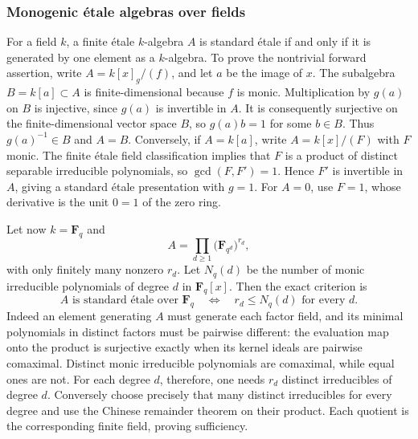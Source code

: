 \subsubsection{Monogenic étale algebras over fields}\label{monogenic-uxe9tale-algebras-over-fields}

For a field \(k\), a finite étale \(k\)-algebra \(A\) is standard étale if and only if it is generated by one element as a \(k\)-algebra. To prove the nontrivial forward assertion, write \(A=k[x]_g/(f)\), and let \(a\) be the image of \(x\). The subalgebra \(B=k[a]\subset A\) is finite-dimensional because \(f\) is monic. Multiplication by \(g(a)\) on \(B\) is injective, since \(g(a)\) is invertible in \(A\). It is consequently surjective on the finite-dimensional vector space \(B\), so \(g(a)b=1\) for some \(b\in B\). Thus \(g(a)^{-1}\in B\) and \(A=B\). Conversely, if \(A=k[a]\), write \(A=k[x]/(F)\) with \(F\) monic. The finite étale field classification implies that \(F\) is a product of distinct separable irreducible polynomials, so \(\gcd(F,F')=1\). Hence \(F'\) is invertible in \(A\), giving a standard étale presentation with \(g=1\). For \(A=0\), use \(F=1\), whose derivative is the unit \(0=1\) of the zero ring.

Let now \(k=\mathbf F_q\) and \[
A=\prod_{d\ge1}\bigl(\mathbf F_{q^d}\bigr)^{r_d},
\] with only finitely many nonzero \(r_d\). Let \(N_q(d)\) be the number of monic irreducible polynomials of degree \(d\) in \(\mathbf F_q[x]\). Then the exact criterion is \[
A\text{ is standard étale over }\mathbf F_q
\quad\Longleftrightarrow\quad
r_d\le N_q(d)\text{ for every }d.
\] Indeed an element generating \(A\) must generate each factor field, and its minimal polynomials in distinct factors must be pairwise different: the evaluation map onto the product is surjective exactly when its kernel ideals are pairwise comaximal. Distinct monic irreducible polynomials are comaximal, while equal ones are not. For each degree \(d\), therefore, one needs \(r_d\) distinct irreducibles of degree \(d\). Conversely choose precisely that many distinct irreducibles for every degree and use the Chinese remainder theorem on their product. Each quotient is the corresponding finite field, proving sufficiency.

